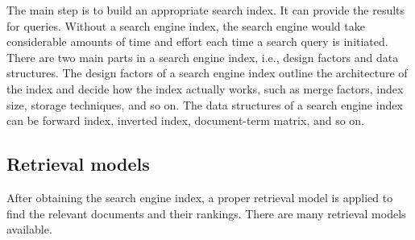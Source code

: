 The main step is to build an appropriate search index. It can provide the results for queries.
Without a search engine index, the search engine would take considerable
amounts of time and effort each time a search query is initiated.
There are two main parts in a search engine index, i.e., design factors and data structures.
The design factors of a search engine index outline the architecture of the index and decide how the index actually works, such as merge factors, index size, storage techniques, and so on.
The data structures of a search engine index can be forward index, inverted index, document-term matrix, and so on.

\subsection{Retrieval models}

After obtaining the search engine index, a proper retrieval model is applied to find the relevant documents and their rankings. There are many retrieval models available.


